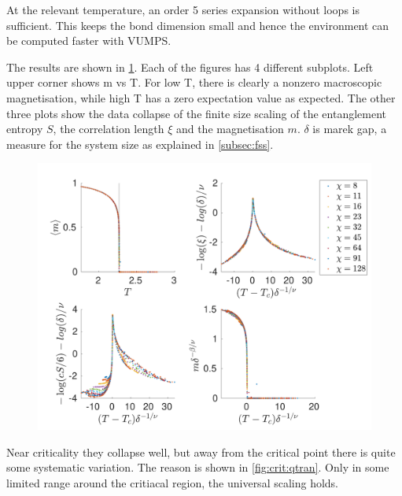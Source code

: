 At the relevant temperature, an order 5 series expansion without loops is sufficient. This keeps the bond dimension small and hence the environment can be computed faster with VUMPS.

The results are shown in \cref{fig:phase:g0:full}. Each of the figures has 4 different subplots. Left upper corner shows m vs T. For low T, there is clearly a nonzero macroscopic magnetisation, while high T has a zero expectation value as expected. The other three plots show the data collapse of the finite size scaling of the entanglement entropy $S$, the correlation length $\xi$ and the magnetisation $m$. $\delta$ is marek gap, a measure for the system size as explained in \cref{subsec:fss}.

\begin{figure}
    \center
    \includegraphics[width=\textwidth]{Figuren/phasediag/g0/Full.pdf}
    \caption{  }
    \label{fig:phase:g0:full}
\end{figure}

Near criticality they collapse well, but away from the critical point there is quite some systematic variation. The reason is shown in \cref{fig:crit:qtran}. Only in some limited range around the critiacal region, the universal scaling holds.

